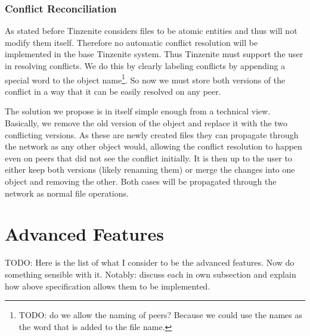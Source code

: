 \subsubsection{Conflict Reconciliation}
\label{subs:Conflict Reconciliation}

As stated before Tinzenite considers files to be atomic entities and thus will not modify them itself.
Therefore no automatic conflict resolution will be implemented in the base Tinzenite system.
Thus Tinzenite must support the user in resolving conflicts.
We do this by clearly labeling conflicts by appending a special word to the object name\footnote{TODO: do we allow the naming of peers? Because we could use the names as the word that is added to the file name.}.
So now we must store both versions of the conflict in a way that it can be easily resolved on any peer.

The solution we propose is in itself simple enough from a technical view.
Basically, we remove the old version of the object and replace it with the two conflicting versions.
As these are newly created files they can propagate through the network as any other object would, allowing the conflict resolution to happen even on peers that did not see the conflict initially.
It is then up to the user to either keep both versions (likely renaming them) or merge the changes into one object and removing the other.
Both cases will be propagated through the network as normal file operations.

\section{Advanced Features}
\label{sec:Advanced Features}

TODO: Here is the list of what I consider to be the advanced features.
Now do something sensible with it.
Notably: discuss each in own subsection and explain how above specification allows them to be implemented.

